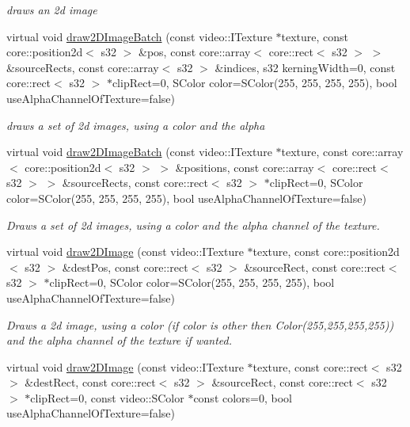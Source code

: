 \begin{DoxyCompactItemize}
\begin{DoxyCompactList}\small\item\em draws an 2d image \end{DoxyCompactList}\item 
virtual void \hyperlink{classirr_1_1video_1_1_c_null_driver_aacce3e035329c8ce9c1396e92d03a138}{draw2\-D\-Image\-Batch} (const video\-::\-I\-Texture $\ast$texture, const core\-::position2d$<$ s32 $>$ \&pos, const core\-::array$<$ core\-::rect$<$ s32 $>$ $>$ \&source\-Rects, const core\-::array$<$ s32 $>$ \&indices, s32 kerning\-Width=0, const core\-::rect$<$ s32 $>$ $\ast$clip\-Rect=0, S\-Color color=S\-Color(255, 255, 255, 255), bool use\-Alpha\-Channel\-Of\-Texture=false)
\begin{DoxyCompactList}\small\item\em draws a set of 2d images, using a color and the alpha \end{DoxyCompactList}\item 
virtual void \hyperlink{classirr_1_1video_1_1_c_null_driver_acaa478188232417236ab174da91bf01d}{draw2\-D\-Image\-Batch} (const video\-::\-I\-Texture $\ast$texture, const core\-::array$<$ core\-::position2d$<$ s32 $>$ $>$ \&positions, const core\-::array$<$ core\-::rect$<$ s32 $>$ $>$ \&source\-Rects, const core\-::rect$<$ s32 $>$ $\ast$clip\-Rect=0, S\-Color color=S\-Color(255, 255, 255, 255), bool use\-Alpha\-Channel\-Of\-Texture=false)
\begin{DoxyCompactList}\small\item\em Draws a set of 2d images, using a color and the alpha channel of the texture. \end{DoxyCompactList}\item 
\hypertarget{classirr_1_1video_1_1_c_null_driver_a55d4a84225a337b26c08df2f4232c741}{virtual void \hyperlink{classirr_1_1video_1_1_c_null_driver_a55d4a84225a337b26c08df2f4232c741}{draw2\-D\-Image} (const video\-::\-I\-Texture $\ast$texture, const core\-::position2d$<$ s32 $>$ \&dest\-Pos, const core\-::rect$<$ s32 $>$ \&source\-Rect, const core\-::rect$<$ s32 $>$ $\ast$clip\-Rect=0, S\-Color color=S\-Color(255, 255, 255, 255), bool use\-Alpha\-Channel\-Of\-Texture=false)}\label{classirr_1_1video_1_1_c_null_driver_a55d4a84225a337b26c08df2f4232c741}

\begin{DoxyCompactList}\small\item\em Draws a 2d image, using a color (if color is other then Color(255,255,255,255)) and the alpha channel of the texture if wanted. \end{DoxyCompactList}\item 
\hypertarget{classirr_1_1video_1_1_c_null_driver_a18b9e06b41140703df8315c7b0c1b69a}{virtual void \hyperlink{classirr_1_1video_1_1_c_null_driver_a18b9e06b41140703df8315c7b0c1b69a}{draw2\-D\-Image} (const video\-::\-I\-Texture $\ast$texture, const core\-::rect$<$ s32 $>$ \&dest\-Rect, const core\-::rect$<$ s32 $>$ \&source\-Rect, const core\-::rect$<$ s32 $>$ $\ast$clip\-Rect=0, const video\-::\-S\-Color $\ast$const colors=0, bool use\-Alpha\-Channel\-Of\-Texture=false)}\label{classirr_1_1video_1_1_c_null_driver_a18b9e06b41140703df8315c7b0c1b69a}


\end{DoxyCompactItemize}
